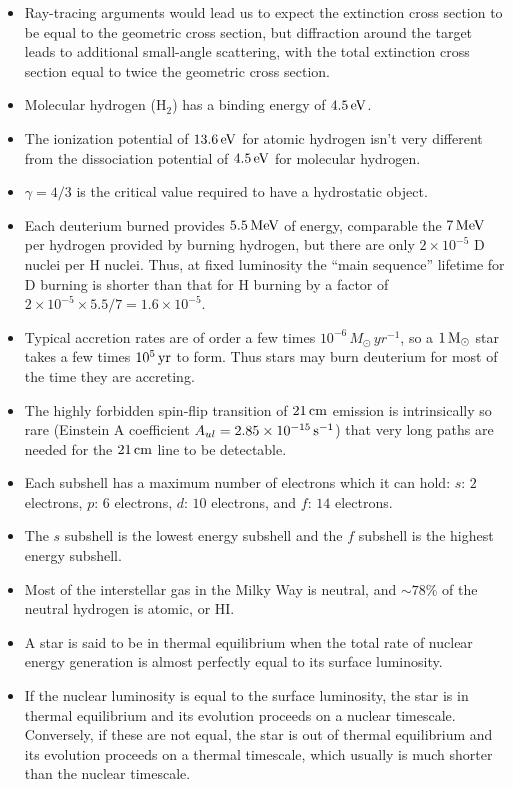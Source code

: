 \documentclass[a4paper,10pt]{article}
\begin{document}
\begin{itemize}
    \item Ray-tracing arguments would lead us to expect the extinction cross section to be equal to the geometric cross section, but diffraction around the target leads to additional small-angle scattering, with the total extinction cross section equal to twice the geometric cross section.
    \item Molecular hydrogen (H$_2$) has a binding energy of $4.5\,{\rm eV}$.
    \item The ionization potential of $13.6\,{\rm eV}$ for atomic hydrogen isn't very different from the dissociation potential of $4.5\,{\rm eV}$ for molecular hydrogen.
    \item $\gamma=4/3$ is the critical value required to have a hydrostatic object.
    \item Each deuterium burned provides $5.5\,{\rm MeV}$ of energy, comparable the $7\,{\rm MeV}$ per hydrogen provided by burning hydrogen, but there are only $2\times10^{-5}$ D nuclei per H nuclei. Thus, at fixed luminosity the ``main sequence'' lifetime for D burning is shorter than that for H burning by a factor of $2\times10^{-5}\times5.5/7 = 1.6\times10^{-5}$.
    \item Typical accretion rates are of order a few times $10^{-6}\,{M_\odot\,yr^{-1}}$, so a $1\,{\rm M_\odot}$ star takes a few times $10^5\,{\rm yr}$ to form. Thus stars may burn deuterium for most of the time they are accreting.
    \item The highly forbidden spin-flip transition of $21\,{\rm cm}$ emission is intrinsically so rare (Einstein A coefficient $A_{ul}=2.85\times10^{-15}\,{\rm s^{-1}}$) that very long paths are needed for the $21\,{\rm cm}$ line to be detectable.
    \item Each subshell has a maximum number of electrons which it can hold: $s$: $2$ electrons, $p$: $6$ electrons, $d$: $10$ electrons, and $f$: $14$ electrons.
    \item The $s$ subshell is the lowest energy subshell and the $f$ subshell is the highest energy subshell.
    \item Most of the interstellar gas in the Milky Way is neutral, and $\sim78\%$ of the neutral hydrogen is atomic, or HI. 
    \item A star is said to be in thermal equilibrium when the total rate of nuclear energy generation is almost perfectly equal to its surface luminosity.
    \item If the nuclear luminosity is equal to the surface luminosity, the star is in thermal equilibrium and its evolution proceeds on a nuclear timescale. Conversely, if these are not equal, the star is out of thermal equilibrium and its evolution proceeds on a thermal timescale, which usually is much shorter than the nuclear timescale.

\end{itemize}
\end{document}
